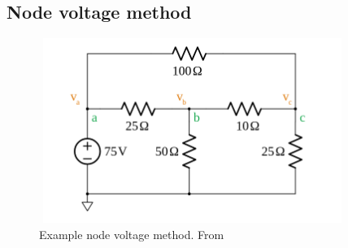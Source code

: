 \newpage
\subsection{Node voltage method}
\begin{figure}[h]
    \vspace{10mm}
    \centering
    \includegraphics[width=10cm, height=6cm]{image/node-voltage-method.png}
    \caption{Example node voltage method. From \cite{}}
\end{figure}



